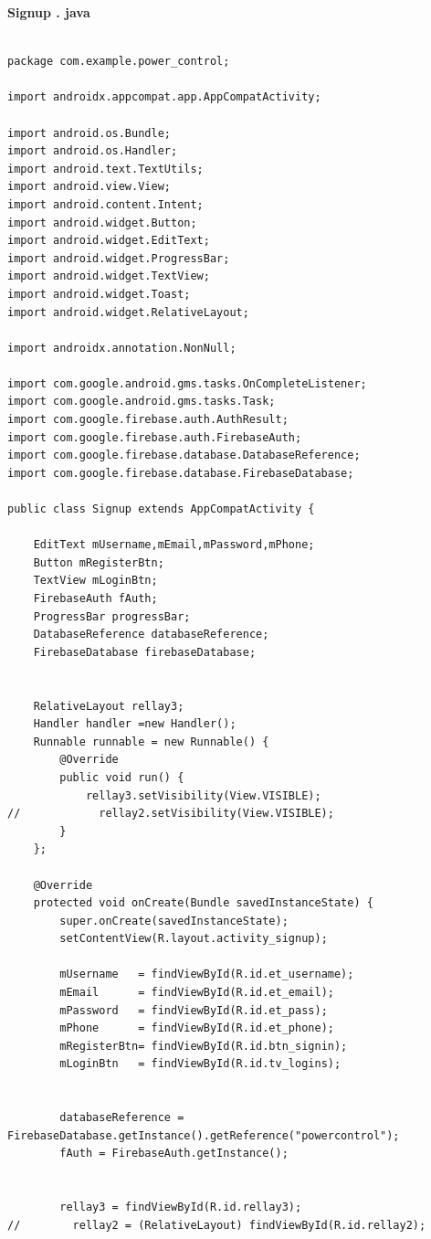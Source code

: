 \documentclass[12pt,a4paper]{article}
\begin{document}
\textbf{\large{Signup . java}}\\ 

\begin{lstlisting}[frame=single]

package com.example.power_control;

import androidx.appcompat.app.AppCompatActivity;

import android.os.Bundle;
import android.os.Handler;
import android.text.TextUtils;
import android.view.View;
import android.content.Intent;
import android.widget.Button;
import android.widget.EditText;
import android.widget.ProgressBar;
import android.widget.TextView;
import android.widget.Toast;
import android.widget.RelativeLayout;

import androidx.annotation.NonNull;

import com.google.android.gms.tasks.OnCompleteListener;
import com.google.android.gms.tasks.Task;
import com.google.firebase.auth.AuthResult;
import com.google.firebase.auth.FirebaseAuth;
import com.google.firebase.database.DatabaseReference;
import com.google.firebase.database.FirebaseDatabase;

public class Signup extends AppCompatActivity {

    EditText mUsername,mEmail,mPassword,mPhone;
    Button mRegisterBtn;
    TextView mLoginBtn;
    FirebaseAuth fAuth;
    ProgressBar progressBar;
    DatabaseReference databaseReference;
    FirebaseDatabase firebaseDatabase;


    RelativeLayout rellay3;
    Handler handler =new Handler();
    Runnable runnable = new Runnable() {
        @Override
        public void run() {
            rellay3.setVisibility(View.VISIBLE);
//            rellay2.setVisibility(View.VISIBLE);
        }
    };

    @Override
    protected void onCreate(Bundle savedInstanceState) {
        super.onCreate(savedInstanceState);
        setContentView(R.layout.activity_signup);

        mUsername   = findViewById(R.id.et_username);
        mEmail      = findViewById(R.id.et_email);
        mPassword   = findViewById(R.id.et_pass);
        mPhone      = findViewById(R.id.et_phone);
        mRegisterBtn= findViewById(R.id.btn_signin);
        mLoginBtn   = findViewById(R.id.tv_logins);


        databaseReference = FirebaseDatabase.getInstance().getReference("powercontrol");
        fAuth = FirebaseAuth.getInstance();


        rellay3 = findViewById(R.id.rellay3);
//        rellay2 = (RelativeLayout) findViewById(R.id.rellay2);


\end{lstlisting}
\end{document}
